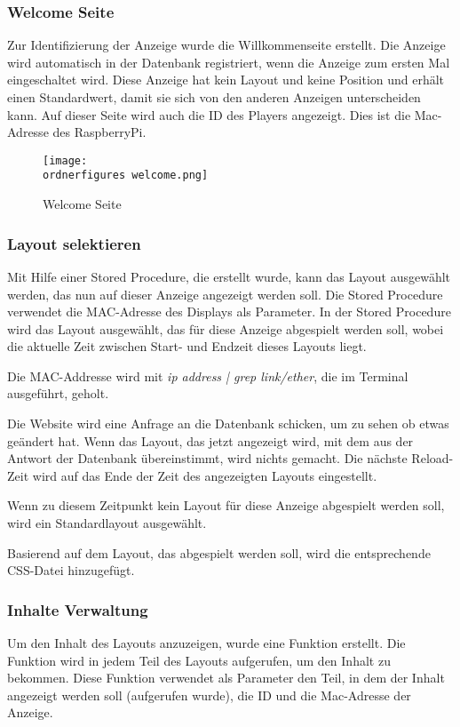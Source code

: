 \subsubsection{Welcome Seite}
Zur Identifizierung der Anzeige wurde die Willkommenseite  erstellt. Die Anzeige wird automatisch in der Datenbank registriert, wenn die Anzeige zum ersten Mal eingeschaltet wird. Diese Anzeige hat kein Layout und keine Position und erhält einen Standardwert, damit sie sich von den anderen Anzeigen unterscheiden kann. 
Auf dieser Seite wird auch die ID des Players angezeigt. Dies ist die Mac-Adresse des RaspberryPi.
\begin{figure}[H]
	\centering
	\texttt{[image: \\ordnerfigures welcome.png]}
	\caption{Welcome Seite}
	\label{fi:welcome}
\end{figure} 

\subsubsection{Layout selektieren}

Mit Hilfe einer Stored Procedure, die erstellt wurde, kann das Layout ausgewählt werden, das nun auf dieser Anzeige angezeigt werden soll. Die Stored Procedure verwendet die MAC-Adresse des Displays als Parameter. In der Stored Procedure wird das Layout ausgewählt, das für diese Anzeige abgespielt werden soll, wobei die aktuelle Zeit zwischen Start- und Endzeit dieses Layouts liegt.

Die MAC-Addresse wird mit \textit{ip address | grep link/ether}, die im Terminal ausgeführt, geholt.

Die Website wird eine Anfrage an die Datenbank schicken, um zu sehen ob etwas geändert hat. Wenn das Layout, das jetzt angezeigt wird, mit dem aus der Antwort der Datenbank übereinstimmt, wird nichts gemacht. Die nächste Reload-Zeit wird auf das Ende der Zeit des angezeigten Layouts eingestellt.

Wenn zu diesem Zeitpunkt kein Layout für diese Anzeige abgespielt werden soll, wird ein Standardlayout ausgewählt.

Basierend auf dem Layout, das abgespielt werden soll, wird die entsprechende CSS-Datei hinzugefügt.

\subsubsection{Inhalte Verwaltung}

Um den Inhalt des Layouts anzuzeigen, wurde eine Funktion erstellt. Die Funktion wird in jedem Teil des Layouts aufgerufen, um den Inhalt zu bekommen. Diese Funktion verwendet als Parameter den Teil, in dem der Inhalt angezeigt werden soll (aufgerufen wurde), die ID und die Mac-Adresse der Anzeige.

